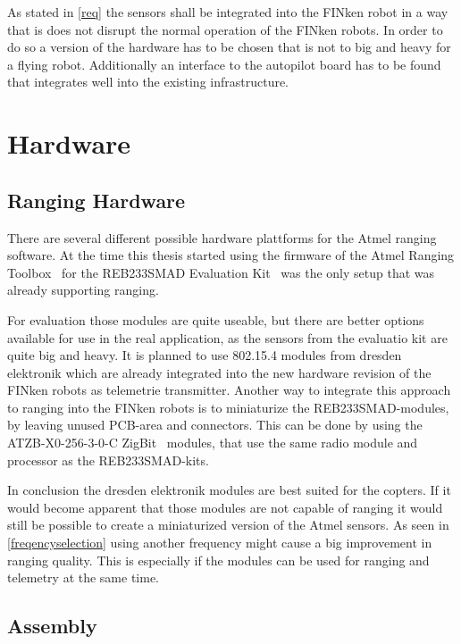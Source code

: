 
As stated in \autoref{req} the sensors shall be integrated into the FINken robot in a way that is does not disrupt the normal operation of the FINken robots.
In order to do so a version of the hardware has to be chosen that is not to big and heavy for a flying robot.
Additionally an interface to the autopilot board has to be found that integrates well into the existing infrastructure.

\section{Hardware}

\subsection{Ranging Hardware}
\label{ranginghardware}

There are several different possible hardware plattforms for the Atmel ranging software.
At the time this thesis started using the firmware of the Atmel Ranging Toolbox~\cite{atmelrtb} for the REB233SMAD Evaluation Kit~\cite{REB233SMAD} was the only setup that was already supporting ranging.

For evaluation those modules are quite useable, but there are better options available for use in the real application, as the sensors from the evaluatio kit are quite big and heavy.
It is planned to use 802.15.4 modules from dresden elektronik which are already integrated into the new hardware revision of the FINken robots as telemetrie transmitter.
Another way to integrate this approach to ranging into the FINken robots is to miniaturize the REB233SMAD-modules, by leaving unused PCB-area and connectors.
This can be done by using the ATZB-X0-256-3-0-C ZigBit~\cite{atmelzigbit} modules, that use the same radio module and processor as the REB233SMAD-kits.

In conclusion the dresden elektronik modules are best suited for the copters.
If it would become apparent that those modules are not capable of ranging it would still be possible to create a miniaturized version of the Atmel sensors.
As seen in \autoref{freqencyselection} using another frequency might cause a big improvement in ranging quality.
This is especially if the modules can be used for ranging and telemetry at the same time.

\subsection{Assembly}

